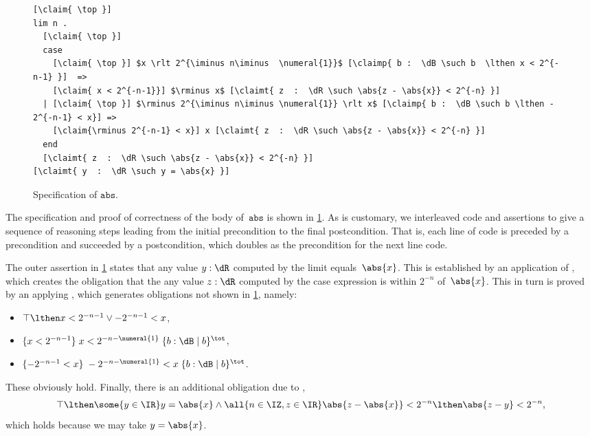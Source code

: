 \begin{figure}[htb]
{\centering\small
\begin{mdframed}
\begin{lstlisting}
[\claim{ \top }]
lim n .
  [\claim{ \top }]
  case
    [\claim{ \top }] $x \rlt 2^{\iminus n\iminus  \numeral{1}}$ [\claimp{ b :  \dB \such b  \lthen x < 2^{-n-1} }]  =>
    [\claim{ x < 2^{-n-1}}] $\rminus x$ [\claimt{ z  :  \dR \such \abs{z - \abs{x}} < 2^{-n} }]
  | [\claim{ \top }] $\rminus 2^{\iminus n\iminus \numeral{1}} \rlt x$ [\claimp{ b :  \dB \such b \lthen - 2^{-n-1} < x}] =>
    [\claim{\rminus 2^{-n-1} < x}] x [\claimt{ z  :  \dR \such \abs{z - \abs{x}} < 2^{-n} }]
  end
  [\claimt{ z  :  \dR \such \abs{z - \abs{x}} < 2^{-n} }]
[\claimt{ y  :  \dR \such y = \abs{x} }]
\end{lstlisting}
%
\end{mdframed}
}
  \caption{Specification of $\mathtt{abs}$.}
  \label{fig:abs-correct}
\end{figure}
%
The specification and proof of correctness of the body of~$\mathtt{abs}$ is shown in \cref{fig:abs-correct}.
As is customary, we interleaved code and assertions to give a sequence of reasoning steps leading from the initial precondition to the final postcondition. That is, each line of code is preceded by a precondition and succeeded by a postcondition, which doubles as the precondition for the next line code.

The outer assertion in \cref{fig:abs-correct} states that any value $y : \dR$ computed by the limit equals~$\abs{x}$.  This is established by an application of , which creates the obligation that the any value $z : \dR$ computed by the case expression is within $2^{-n}$ of~$\abs{x}$. This in turn is proved by an applying , which generates obligations not shown in \cref{fig:abs-correct}, namely:
%
\begin{itemize}
\item $\top \lthen x < 2^{-n - 1} \lor -2^{-n-1} < x$,
\item $\{ x < 2^{-n-1} \}\; x < 2^{-n - \numeral{1}}\; \{ b : \dB \mid b \}^\tot$,
\item $\{ -2^{-n-1} < x \}\; -2^{-n - \numeral{1}} < x \; \{ b : \dB \mid b \}^\tot$.
\end{itemize}
%
These obviously hold.
%
Finally, there is an additional obligation due to ,
%
\begin{equation*}
  \top \lthen
   \some{y \in \IR}
   y = \abs{x} \land
   \all{n \in \IZ, z\in\IR} \abs{z - \abs{x}} < 2^{-n} \lthen \abs{z - y} < 2^{-n},
\end{equation*}
%
which holds because we may take $y = \abs{x}$.

